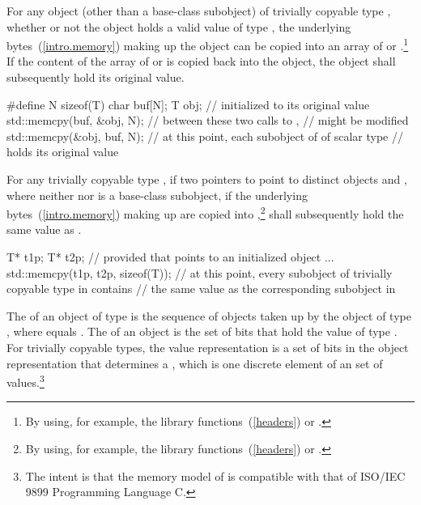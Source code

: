 \pnum
{}%
%
For any object (other than a base-class subobject) of trivially copyable type
, whether or not the object holds a valid value of type
, the underlying bytes~(\ref{intro.memory}) making up the
object can be copied into an array of  or 
.\footnote{By using, for example, the library
functions~(\ref{headers})  or .}
If the content of the array of  or 
 is copied back into the object, the object shall
subsequently hold its original value. \enterexample

\begin{codeblock}
#define N sizeof(T)
char buf[N];
T obj;                          //  initialized to its original value
std::memcpy(buf, &obj, N);      // between these two calls to ,
                                //  might be modified
std::memcpy(&obj, buf, N);      // at this point, each subobject of  of scalar type
                                // holds its original value
\end{codeblock}
\exitexample 

\pnum
For any trivially copyable type , if two pointers to  point to
distinct  objects  and , where neither
 nor  is a base-class subobject, if the underlying
bytes~(\ref{intro.memory}) making up
 are copied into ,\footnote{By using, for example,
the library functions~(\ref{headers})  or .}
  shall subsequently hold the same value as
. \enterexample

\begin{codeblock}
T* t1p;
T* t2p;
    // provided that  points to an initialized object ...
std::memcpy(t1p, t2p, sizeof(T));
    // at this point, every subobject of trivially copyable type in  contains
    // the same value as the corresponding subobject in 
\end{codeblock}
\exitexample%

\pnum
The 
%
of an object of type  is the
sequence of    objects taken up
by the object of type , where  equals
. The
%
of an object is the set of bits that hold
the value of type . For trivially copyable types, the value representation is
a set of bits in the object representation that determines a
, which is one discrete element of an
 set of values.\footnote{The
intent is that the memory model of \Cpp is compatible
with that of ISO/IEC 9899 Programming Language C.}

